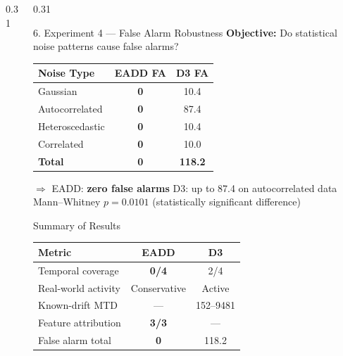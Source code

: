 \documentclass[final]{beamer}
\begin{document}
\begin{frame}[t]
\begin{columns}[t]
\begin{column}{0.31\textwidth}
\end{column}

\begin{column}{0.31\textwidth}

\begin{block}{6. Experiment 4 — False Alarm Robustness}
\large
\textbf{Objective:} Do statistical noise patterns cause false alarms?

\vskip0.5cm
\begin{table}
\centering
\renewcommand{\arraystretch}{1.3}
\begin{tabular}{lcc}
\toprule
\textbf{Noise Type} & \textbf{EADD FA} & \textbf{D3 FA} \\
\midrule
Gaussian       & \color{AccentGreen}\textbf{0} & 10.4 \\
Autocorrelated & \color{AccentGreen}\textbf{0} & 87.4 \\
Heteroscedastic & \color{AccentGreen}\textbf{0} & 10.4 \\
Correlated     & \color{AccentGreen}\textbf{0} & 10.0 \\
\midrule
\textbf{Total} & \color{AccentGreen}\textbf{0} & \color{AccentRed}\textbf{118.2} \\
\bottomrule
\end{tabular}
\end{table}

\vskip0.3cm
{\color{MahidolBlue}$\Rightarrow$} EADD: \textbf{zero false alarms} \quad D3: up to 87.4 on autocorrelated data\\[4pt]
Mann--Whitney $p = 0.0101$ (statistically significant difference)
\end{block}

\vskip1cm

\begin{alertblock}{Summary of Results}
\large
\renewcommand{\arraystretch}{1.4}
\begin{center}
\begin{tabular}{lcc}
\toprule
\textbf{Metric} & \textbf{EADD} & \textbf{D3} \\
\midrule
Temporal coverage     & \textbf{0/4}  & 2/4 \\
Real-world activity   & Conservative  & Active \\
Known-drift MTD       & --- & 152--9481 \\
Feature attribution   & \textbf{3/3}  & --- \\
False alarm total     & \textbf{0}    & 118.2 \\
\bottomrule
\end{tabular}
\end{center}
\end{alertblock}


\end{column}
\end{columns}
\end{frame}
\end{document}
